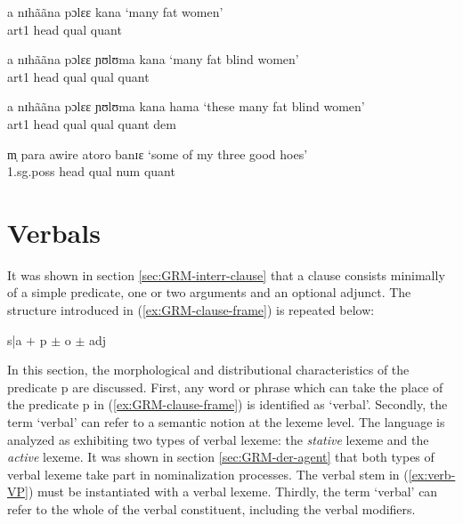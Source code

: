 \begin{exe}
\begin{xlist}
\ex\label{ex:GRM-ahqlq} 
 a nɪhããna pɔlɛɛ kana   `many fat women'  \\  
{\sc art1} {\sc head} {\sc qual} {\sc quant}  

 \ex\label{ex:GRM-ahqlqlq} 
 a nɪhããna pɔlɛɛ ɲʊlʊma kana   `many fat blind women'   \\ 
{\sc art1} {\sc head} {\sc qual} {\sc qual} {\sc quant}  

  \ex\label{ex:GRM-ahqlqlqd} 
a nɪhããna pɔlɛɛ ɲʊlʊma kana hama   `these many fat blind women'  \\ 
{\sc art1} {\sc head} {\sc qual} {\sc qual} {\sc quant}  {\sc dem}

 \ex\label{ex:GRM-phqlnq} 
m̩ para awire atoro banɪɛ `some of my three good hoes' \\ 
{\sc 1.sg.poss} {\sc head} {\sc qual} {\sc num} {\sc quant}

 \end{xlist}
\end{exe}



\section{Verbals}
\label{sec:GRM-verbals}


It was  shown in section 
 \ref{sec:GRM-interr-clause} that a clause consists minimally of  a simple
predicate, one or two arguments and an
optional adjunct.  The structure introduced in (\ref{ex:GRM-clause-frame}) is
repeated below:


\begin{exe}
 {\sc s|a}  $+$ {\sc p} $\pm$ {\sc o} $\pm$ {\sc adj} 
\end{exe}

In this section,  the morphological  and distributional characteristics of
the predicate {\sc p} are discussed.  First, any word or phrase which can take
the place of  the predicate {\sc p} in  (\ref{ex:GRM-clause-frame}) is
identified as `verbal'.  Secondly, the term `verbal'  can refer to a
semantic notion at the lexeme level. The language is analyzed as exhibiting two
types of verbal lexeme: the {\it stative} lexeme and the {\it active} lexeme.  
It was shown in section \ref{sec:GRM-der-agent} that
both types of verbal lexeme take part in nominalization processes. The verbal
stem in (\ref{ex:verb-VP})  must be instantiated with a
verbal lexeme. Thirdly, the
term `verbal' can refer to the whole of the verbal constituent, including the
verbal modifiers.


